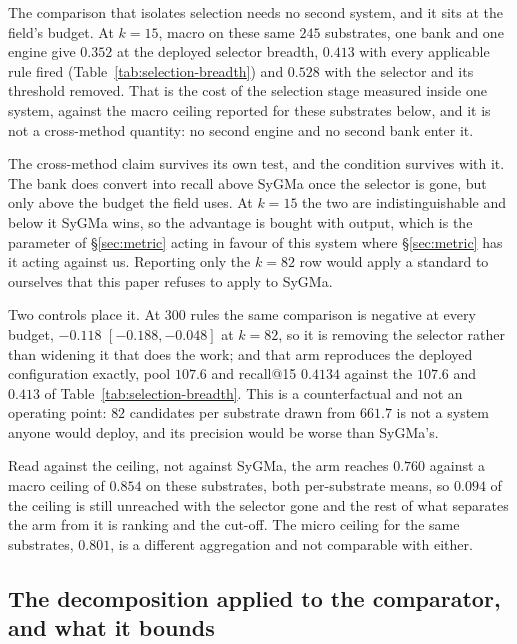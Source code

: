 The comparison that isolates selection needs no second system, and it sits at the field's budget.
At $k=15$, macro on these same $245$ substrates, one bank and one engine give $0.352$ at the deployed selector breadth,
$0.413$ with every applicable rule fired (Table~\ref{tab:selection-breadth}) and $0.528$ with the
selector and its threshold removed. That is the cost of the selection stage measured inside one
system, against the macro ceiling reported for these substrates below, and it is not a cross-method
quantity: no second engine and no second bank enter it.

The cross-method claim survives its own test, and the condition survives with it. The bank does convert into
recall above SyGMa once the selector is gone, but only above the budget the field uses. At $k=15$
the two are indistinguishable and below it SyGMa wins, so the advantage is bought with output, which
is the parameter of \S\ref{sec:metric} acting in favour of this system where \S\ref{sec:metric} has it acting
against us. Reporting only the $k=82$ row would apply a standard to ourselves that this paper
refuses to apply to SyGMa.

Two controls place it. At $300$ rules the same comparison is negative at every budget, $-0.118$
$[-0.188,-0.048]$ at $k=82$, so it is removing the selector rather than widening it that does the
work; and that arm reproduces the deployed configuration exactly, pool $107.6$ and recall@15
$0.4134$ against the $107.6$ and $0.413$ of Table~\ref{tab:selection-breadth}. This is a
counterfactual and not an operating point: $82$ candidates per substrate drawn from $661.7$ is not a
system anyone would deploy, and its precision would be worse than SyGMa's.

Read against the ceiling, not against SyGMa, the arm reaches $0.760$ against a macro ceiling
of $0.854$ on these substrates, both per-substrate means, so $0.094$ of the ceiling is still
unreached with the selector gone and the rest of what separates the arm from it is ranking and the
cut-off. The micro ceiling for the same substrates, $0.801$, is a different aggregation and not
comparable with either.

\subsection{The decomposition applied to the comparator, and what it bounds}
\label{app:decompsygma}


